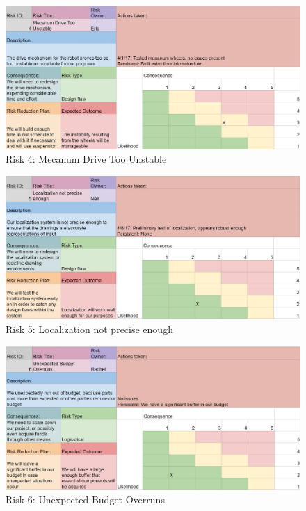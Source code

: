 \begin{figure}[h!]
\centering
\includegraphics[width=0.98\columnwidth]{risks/risk4.JPG}
\caption{Risk 4: Mecanum Drive Too Unstable}
\label{fig:risk4}
\end{figure}

\begin{figure}[!ht]
\centering
\includegraphics[width=0.98\columnwidth]{risks/risk5.JPG}
\caption{Risk 5: Localization not precise enough}
\label{fig:risk5}
\end{figure}

\begin{figure}[!ht]
\centering
\includegraphics[width=0.98\columnwidth]{risks/risk6.JPG}
\caption{Risk 6: Unexpected Budget Overruns}
\label{fig:risk6}
\end{figure}

\clearpage
